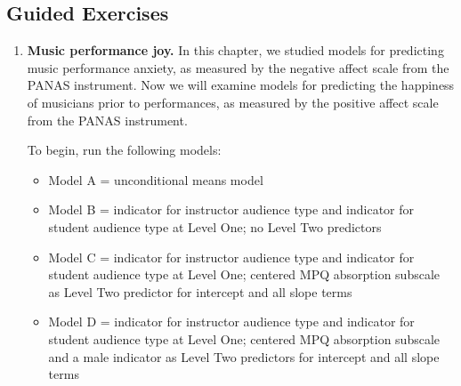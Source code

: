 \documentclass[
]{krantz}
\providecommand{\tightlist}{%
  \setlength{\itemsep}{0pt}\setlength{\parskip}{0pt}}
\begin{document}
\subsection{Guided Exercises}\label{guided-exercises-6}

\begin{enumerate}
\def\labelenumi{\arabic{enumi}.}
\item
  \textbf{Music performance joy.} In this chapter, we studied models for predicting music performance anxiety, as measured by the negative affect scale from the PANAS instrument. Now we will examine models for predicting the happiness of musicians prior to performances, as measured by the positive affect scale from the PANAS instrument.

  To begin, run the following models:

  \begin{itemize}
  \tightlist
  \item
    Model A = unconditional means model
  \item
    Model B = indicator for instructor audience type and indicator for student audience type at Level One;
    no Level Two predictors
  \item
    Model C = indicator for instructor audience type and indicator for student audience type at Level One;
    centered MPQ absorption subscale as Level Two predictor for intercept and all slope terms
  \item
    Model D = indicator for instructor audience type and indicator for student audience type at Level One;
    centered MPQ absorption subscale and a male indicator as Level Two predictors for intercept and all slope terms
  \end{itemize}


\end{enumerate}
\end{document}
